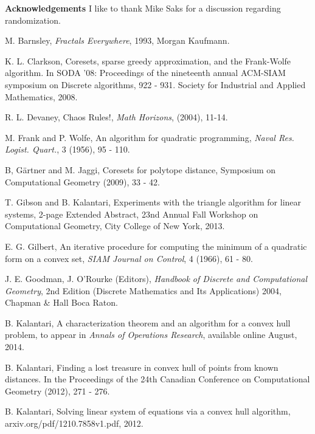 \documentclass{article}
\theoremstyle{definition}
\begin{document}
{\bf Acknowledgements}  I like to thank Mike Saks for a discussion regarding randomization.

\begin{thebibliography}{9}



 M. Barnsley, {\it Fractals Everywhere}, 1993,  Morgan Kaufmann.\filbreak

 K. L. Clarkson, Coresets, sparse greedy approximation,
and the Frank-Wolfe algorithm. In SODA
'08: Proceedings of the nineteenth annual ACM-SIAM symposium on Discrete algorithms,
922 - 931. Society for Industrial and Applied Mathematics,
2008. \filbreak

 R. L. Devaney, Chaos Rules!,
{\it Math Horizons},  (2004),  11-14. \filbreak

 M. Frank and P. Wolfe, An algorithm for quadratic
programming, {\it Naval Res. Logist. Quart.},  3 (1956), 95 - 110. \filbreak

 B, G{\"a}rtner and M. Jaggi, Coresets for polytope distance,
Symposium on Computational Geometry (2009), 33 - 42.\filbreak

 T. Gibson and B. Kalantari, Experiments with the triangle algorithm for linear systems, 2-page Extended Abstract, 23nd Annual Fall Workshop on Computational Geometry, City College of New York, 2013. \filbreak

 E. G. Gilbert, An iterative procedure for computing
the minimum of a quadratic form on a convex set, {\it
SIAM Journal on Control}, 4 (1966), 61 - 80. \filbreak

 J. E. Goodman, J. O'Rourke (Editors), {\it Handbook of Discrete and Computational Geometry}, 2nd Edition (Discrete Mathematics and Its Applications) 2004, Chapman \& Hall Boca Raton.\filbreak

 B. Kalantari, A characterization theorem and an algorithm for a convex hull problem, to appear in {\it Annals of Operations Research}, available online August, 2014. \filbreak

 B. Kalantari, Finding a lost treasure in convex hull of points from known distances. In the  Proceedings of the 24th Canadian Conference on Computational Geometry (2012), 271 - 276. \filbreak

 B. Kalantari, Solving linear system of equations via a convex hull algorithm, arxiv.org/pdf/1210.7858v1.pdf,  2012. \filbreak


\end{thebibliography}
\end{document}
